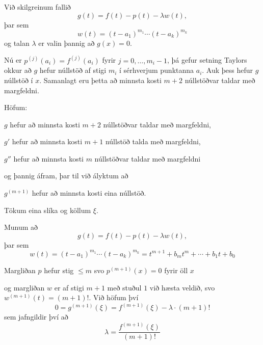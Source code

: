 \documentclass[icelandic,a4paper,12pt]{article}
\begin{document}
\pause
\smallskip
Við skilgreinum fallið
\begin{equation*}
  g(t) = f(t) - p(t) - \lambda w(t),
\end{equation*}
þar sem
\begin{equation*}
  w(t) = (t-a_1)^{m_1} \cdots (t-a_k)^{m_k}
\end{equation*}
og talan $\lambda$ er valin þannig að $g(x) = 0$. 

\pause
\smallskip
Nú er $p^{(j)}(a_i)=f^{(j)}(a_i)$  fyrir $j=0,\dots,m_i-1$,   
þá gefur setning Taylors okkur að $g$
hefur núllstöð  af stigi $m_i$ í sérhverjum punktanna $a_i$.
Auk þess hefur $g$ núllstöð í $x$.  Samanlagt eru þetta  að minnsta
kosti 
$m+2$ núllstöðvar taldar með margfeldni.


 Höfum:

\smallskip
$g$ hefur  að minnsta kosti $m+2$ núllstöðvar taldar með margfeldni,

\pause
\smallskip
$g'$ hefur  að minnsta kosti $m+1$ núllstöð talda með margfeldni,


\pause
\smallskip
$g''$ hefur  að minnsta kosti $m$ núllstöðvar taldar með margfeldni 

\pause
\smallskip
og þannig áfram, þar til við ályktum að 


\pause
\smallskip
$g^{(m+1)}$ hefur  að minnsta kosti eina  núllstöð.  

\pause
\smallskip
Tökum eina slíka og köllum $\xi$.


Munum að 
\begin{equation*}
  g(t) = f(t) - p(t) - \lambda w(t),
\end{equation*}
þar sem
\begin{equation*}
  w(t) = (t-a_1)^{m_1} \cdots (t-a_k)^{m_k}=t^{m+1}+b_mt^m+\cdots+b_1t+b_0
\end{equation*}

\pause
\smallskip
Margliðan $p$ hefur stig $\leq m$ svo $p^{(m+1)}(x) = 0$  fyrir öll
$x$ 

\pause
og margliðan $w$ er af stigi $m+1$ með stuðul $1$ við hæsta veldið,
svo $w^{(m+1)}(t) = (m+1)!$. Við höfum því
\begin{equation*}
  0 = g^{(m+1)}(\xi) = f^{(m+1)}(\xi) - \lambda \cdot (m+1)!
\end{equation*}
sem jafngildir því að
$$
\lambda =\dfrac{f^{(m+1)}(\xi)}{(m+1)!}
$$
\end{document}
